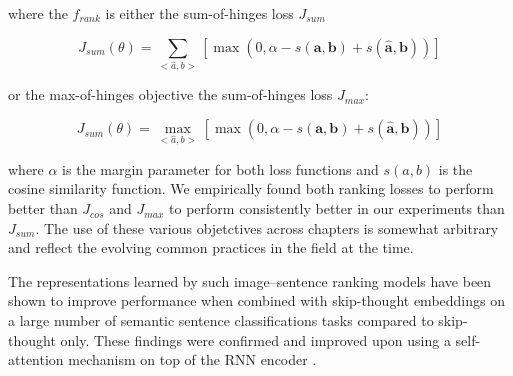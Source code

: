 where the $f_{rank}$ is either the sum-of-hinges loss $J_{sum}$

\begin{equation}
\label{eq:sumviol}
J_{sum}(\theta) = \sum_{<\hat{a},b>}[\max(0, \alpha - s(\mathbf{a},\mathbf{b}) + s(\hat{\mathbf{a}}, \mathbf{b}))] 
\end{equation}

or the max-of-hinges objective the sum-of-hinges loss $J_{max}$:

\begin{equation}
\label{eq:maxviol}
J_{sum}(\theta) = \max_{<\hat{a}, b>}[\max(0, \alpha - s(\mathbf{a},\mathbf{b}) + s(\hat{\mathbf{a}}, \mathbf{b}))]
\end{equation}

where $\alpha$ is the margin parameter for both loss functions and $s(a, b)$ is the cosine similarity
function.
We empirically found both ranking losses to perform better than $J_{cos}$ and $J_{max}$ to perform
consistently better in our experiments than $J_{sum}$. The use of these various objetctives across
chapters is somewhat arbitrary and reflect the evolving common practices in the field at the time. 




The representations learned by such image--sentence  ranking models have 
been shown \citep{kiela2017learning}
to improve performance when combined with skip-thought embeddings
on a large number of semantic sentence classifications tasks compared to
skip-thought only. These findings were confirmed and improved upon using a
self-attention mechanism on top of the RNN encoder \citep{yoo2017improving}.


